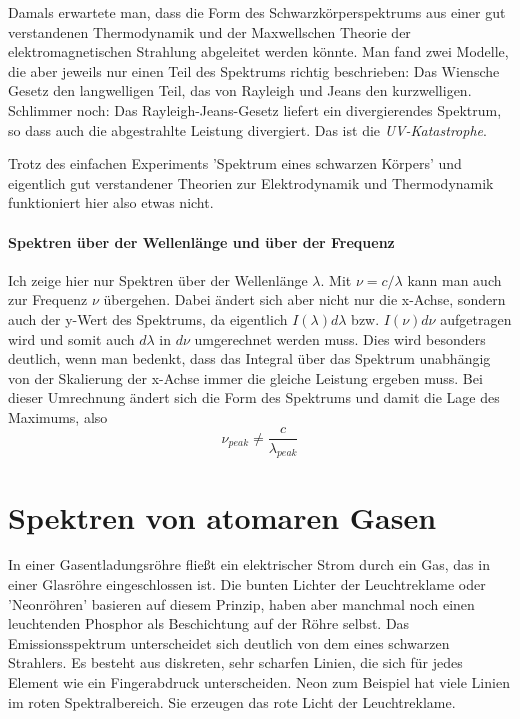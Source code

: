 Damals erwartete man, dass die Form des Schwarzkörperspektrums aus einer gut verstandenen Thermodynamik und der Maxwellschen Theorie der elektromagnetischen Strahlung abgeleitet werden könnte. Man fand zwei Modelle, die aber jeweils nur einen Teil des Spektrums richtig beschrieben: Das Wiensche Gesetz den langwelligen Teil, das von Rayleigh und Jeans den kurzwelligen. Schlimmer noch: Das Rayleigh-Jeans-Gesetz liefert ein divergierendes Spektrum, so dass auch die abgestrahlte Leistung divergiert. Das ist die \emph{UV-Katastrophe}.

Trotz des einfachen Experiments 'Spektrum eines schwarzen Körpers' und eigentlich gut verstandener Theorien zur Elektrodynamik und Thermodynamik funktioniert hier also etwas nicht.


\paragraph*{Spektren über der Wellenlänge und über der Frequenz} Ich zeige hier nur Spektren über der Wellenlänge $\lambda$. Mit $\nu = c / \lambda$ kann man auch zur Frequenz $\nu$ übergehen. Dabei ändert sich aber nicht nur die x-Achse, sondern auch der y-Wert des Spektrums, da eigentlich $I(\lambda) d\lambda$ bzw. $I(\nu) d\nu$ aufgetragen wird und somit auch $d\lambda$ in $d\nu$ umgerechnet werden muss. Dies wird besonders deutlich, wenn man bedenkt, dass das Integral über das Spektrum unabhängig von der Skalierung der x-Achse immer die gleiche Leistung ergeben muss. Bei dieser Umrechnung ändert sich die Form des Spektrums und damit die Lage des Maximums, also 
\begin{equation}
    \nu_{peak} \neq \frac{c}{\lambda_{peak}}
\end{equation}

\section{Spektren von atomaren Gasen}

In einer Gasentladungsröhre fließt ein elektrischer Strom durch ein Gas, das in einer Glasröhre eingeschlossen ist. Die bunten Lichter der Leuchtreklame oder 'Neonröhren' basieren auf diesem Prinzip, haben aber manchmal noch einen leuchtenden Phosphor als Beschichtung auf der Röhre selbst. Das Emissionsspektrum unterscheidet sich deutlich von dem eines schwarzen Strahlers. Es besteht aus diskreten, sehr scharfen Linien, die sich für jedes Element wie ein Fingerabdruck unterscheiden. Neon zum Beispiel hat viele Linien im roten Spektralbereich. Sie erzeugen das rote Licht der Leuchtreklame.

